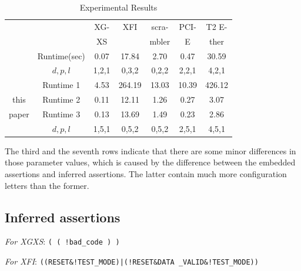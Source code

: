 \documentclass[journal]{IEEEtran}
\begin{document}
\begin{table}[t]
\centering
\caption{Experimental Results}
\begin{tabular}{|c|c|c|c|c|c|c|}
\hline
&                                        &XG-     &XFI       &scra-     &PCI-    &T2 E-\\
&                                        &XS      &          &mbler     &E       &ther\\\hline
\cite{ShengYuShen:tcad11}&Runtime(sec)   &0.07    &17.84     &2.70      &0.47    &30.59\\\cline{2-7}
&$d,p,l$                                 &1,2,1   &0,3,2     &0,2,2     &2,2,1   &4,2,1         \\ \hline\hline
    &Runtime 1                           &4.53    & 264.19   &13.03     &10.39   &426.12      \\\cline{2-7}
this&Runtime 2                           &0.11    & 12.11    &1.26      &0.27    &3.07      \\\cline{2-7}
paper&Runtime 3                          &0.13    &13.69     &1.49      &0.23    &2.86      \\\cline{2-7}
    &$d,p,l$                             &1,5,1   &0,5,2     &0,5,2     &2,5,1   &4,5,1          \\ \hline %
\end{tabular}\label{tab_res}
\end{table}
The third and the seventh rows indicate that there are some minor differences in those parameter values,
which is caused by the difference between the embedded assertions and inferred assertions.
The latter contain much more configuration letters than the former.

\subsection{Inferred assertions}

\emph{For XGXS}:
\texttt{( ( !bad\_code ) )}

\emph{For XFI}:
\texttt{((RESET\&!TEST\_MODE)|(!RESET\&DATA
\_VALID\&!TEST\_MODE))}
\end{document}
